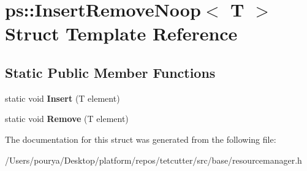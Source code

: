 \hypertarget{structps_1_1InsertRemoveNoop}{}\section{ps\+:\+:Insert\+Remove\+Noop$<$ T $>$ Struct Template Reference}
\label{structps_1_1InsertRemoveNoop}
\subsection*{Static Public Member Functions}
\begin{DoxyCompactItemize}
\item 
\hypertarget{structps_1_1InsertRemoveNoop_ac756e101f7277b633f02d00ed05c85c4}{}static void {\bfseries Insert} (T element)\label{structps_1_1InsertRemoveNoop_ac756e101f7277b633f02d00ed05c85c4}

\item 
\hypertarget{structps_1_1InsertRemoveNoop_a8371d84bf1932ef8437ab733d48b5e48}{}static void {\bfseries Remove} (T element)\label{structps_1_1InsertRemoveNoop_a8371d84bf1932ef8437ab733d48b5e48}

\end{DoxyCompactItemize}


The documentation for this struct was generated from the following file\+:\begin{DoxyCompactItemize}
\item 
/\+Users/pourya/\+Desktop/platform/repos/tetcutter/src/base/resourcemanager.\+h\end{DoxyCompactItemize}
